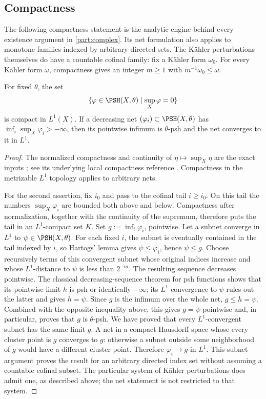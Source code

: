 \subsection{Compactness}
\label{sec:ch51-compactness}

The following compactness statement is the analytic engine behind every
existence argument in \cref{part:complex}. Its net formulation also
applies to monotone families indexed by arbitrary directed sets.
The K\"ahler perturbations themselves do have a countable cofinal
family: fix a K\"ahler form $\omega_0$.
For every K\"ahler form $\omega$, compactness gives an integer
$m\geq1$ with $m^{-1}\omega_0\leq\omega$.

\begin{proposition}\label{prop:complex-l1-compactness}
For fixed $\theta$, the set
\[
     \{\varphi\in\PSH(X,\theta)\mid \sup_X\varphi=0\}
\]
is compact in $L^1(X)$.  If a decreasing net
$(\varphi_i)\subset\PSH(X,\theta)$ has
$\inf_i\sup_X\varphi_i>-\infty$, then its pointwise infimum is
$\theta$-psh and the net converges to it in $L^1$.
\end{proposition}

\begin{proof}
The normalized compactness and continuity of
$\eta\mapsto\sup_X\eta$ are the exact inputs
\cite[Proposition~1.5.1]{XiaBook}; see its underlying local compactness
reference \cite[Proposition~8.5 and Exercise~1.20]{GZ17}.
Compactness in the metrizable $L^1$ topology applies to arbitrary nets.

For the second assertion, fix $i_0$ and pass to the cofinal tail
$i\geq i_0$.  On this tail the numbers $\sup_X\varphi_i$ are bounded
both above and below.  Compactness after normalization, together with
the continuity of the supremum, therefore puts the tail in an
$L^1$-compact set $K$.
Set $g:=\inf_i\varphi_i$, pointwise.  Let a subnet converge in
$L^1$ to $\psi\in\PSH(X,\theta)$.  For each fixed $i$, the subnet
is eventually contained in the tail indexed by $i$, so Hartogs'
lemma gives $\psi\leq\varphi_i$, hence $\psi\leq g$.
Choose recursively terms of this convergent subnet whose original
indices increase and whose $L^1$-distance to $\psi$ is less than
$2^{-m}$.  The resulting sequence decreases pointwise.  The classical
decreasing-sequence theorem for psh functions shows that its pointwise
limit $h$ is psh or identically $-\infty$; its $L^1$-convergence
to $\psi$ rules out the latter and gives $h=\psi$.  Since $g$ is
the infimum over the whole net, $g\leq h=\psi$.  Combined with the
opposite inequality above, this gives $g=\psi$ pointwise and, in
particular, proves that $g$ is $\theta$-psh.  We have proved that every
$L^1$-convergent subnet has the same limit $g$.  A net in a compact
Hausdorff space whose every cluster point is $g$ converges to $g$:
otherwise a subnet outside some neighborhood of $g$ would have a
different cluster point.  Therefore $\varphi_i\to g$ in $L^1$.
This subnet argument proves the result for an arbitrary directed index
set without assuming a countable cofinal subset.  The particular system
of K\"ahler perturbations does admit one, as described above; the net
statement is not restricted to that system.
\end{proof}

